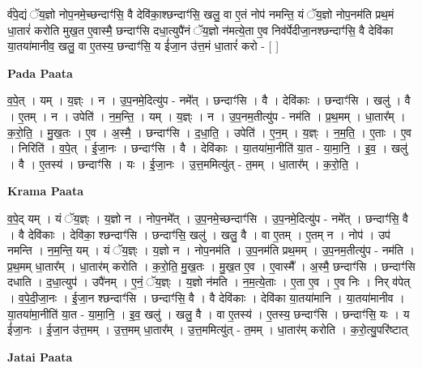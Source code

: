 \documentclass[17pt]{extarticle}
\begin{document}
र्व॑पे॒द्यं ॅय॒ज्ञो नोप॒नमे॒च्छन्दाꣳ॑सि॒ वै देवि॑का॒श्छन्दाꣳ॑सि॒ खलु॒ वा ए॒तं नोप॑ नमन्ति॒ यं ॅय॒ज्ञो नोप॒नम॑ति प्रथ॒मं धा॒तारं॑ करोति मुख॒त ए॒वास्मै॒ छन्दाꣳ॑सि दधा॒त्युपै॑नं ॅय॒ज्ञो न॑मत्ये॒ता ए॒व निव॑र्पेदीजा॒नश्छन्दाꣳ॑सि॒ वै देवि॑का या॒तया॑मानीव॒ खलु॒ वा ए॒तस्य॒ छन्दाꣳ॑सि॒ य ई॑जा॒न उ॑त्त॒मं धा॒तारं॑ करो - [  ] \newline

\textbf{Pada Paata} \newline

व॒पे॒त् । यम् । य॒ज्ञ्ः । न । उ॒प॒नमे॒दित्यु॑प - नमे᳚त् । छन्दाꣳ॑सि । वै । देवि॑काः । छन्दाꣳ॑सि । खलु॑ । वै । ए॒तम् । न । उपेति॑ । न॒म॒न्ति॒ । यम् । य॒ज्ञ्ः । न । उ॒प॒नम॒तीत्यु॑प - नम॑ति । प्र॒थ॒मम् । धा॒तार᳚म् । क॒रो॒ति॒ । मु॒ख॒तः । ए॒व । अ॒स्मै॒ । छन्दाꣳ॑सि । द॒धा॒ति॒ । उपेति॑ । ए॒न॒म् । य॒ज्ञ्ः । न॒म॒ति॒ । ए॒ताः । ए॒व । निरिति॑ । व॒पे॒त् । ई॒जा॒नः । छन्दाꣳ॑सि । वै । देवि॑काः । या॒तया॑मा॒नीति॑ या॒त - या॒मा॒नि॒ । इ॒व॒ । खलु॑ । वै । ए॒तस्य॑ । छन्दाꣳ॑सि । यः । ई॒जा॒नः । उ॒त्त॒ममित्यु॑त् - त॒मम् । धा॒तार᳚म् । क॒रो॒ति॒ ।  \newline


\textbf{Krama Paata} \newline

व॒पे॒द् यम् । यं ॅय॒ज्ञ्ः । य॒ज्ञो न । नोप॒नमे᳚त् । उ॒प॒नमे॒च्छन्दाꣳ॑सि । उ॒प॒नमे॒दित्यु॑प - नमे᳚त् । छन्दाꣳ॑सि॒ वै । वै देवि॑काः । देवि॑का॒ श्छन्दाꣳ॑सि । छन्दाꣳ॑सि॒ खलु॑ । खलु॒ वै । वा ए॒तम् । ए॒तम् न । नोप॑ । उप॑ नमन्ति । न॒म॒न्ति॒ यम् । यं ॅय॒ज्ञ्ः । य॒ज्ञो न । नोप॒नम॑ति । उ॒प॒नम॑ति प्रथ॒मम् । उ॒प॒नम॒तीत्यु॑प - नम॑ति । प्र॒थ॒मम् धा॒तार᳚म् । धा॒तार॑म् करोति । क॒रो॒ति॒ मु॒ख॒तः । मु॒ख॒त ए॒व । ए॒वास्मै᳚ । अ॒स्मै॒ छन्दाꣳ॑सि । छन्दाꣳ॑सि दधाति । द॒धा॒त्युप॑ । उपै॑नम् । ए॒नं॒ ॅय॒ज्ञ्ः । य॒ज्ञो न॑मति । न॒म॒त्ये॒ताः । ए॒ता ए॒व । ए॒व निः । निर् व॑पेत् । व॒पे॒दी॒जा॒नः । ई॒जा॒न श्छन्दाꣳ॑सि । छन्दाꣳ॑सि॒ वै । वै देवि॑काः । देवि॑का या॒तया॑मानि । या॒तया॑मानीव । या॒तया॑मा॒नीति॑ या॒त - या॒मा॒नि॒ । इ॒व॒ खलु॑ । खलु॒ वै । वा ए॒तस्य॑ । ए॒तस्य॒ छन्दाꣳ॑सि । छन्दाꣳ॑सि॒ यः । य ई॑जा॒नः । ई॒जा॒न उ॑त्त॒मम् । उ॒त्त॒मम् धा॒तार᳚म् । उ॒त्त॒ममित्यु॑त् - त॒मम् । धा॒तार॑म् करोति । क॒रो॒त्यु॒परि॑ष्टात् \newline

\textbf{Jatai Paata} \newline
\end{document}
